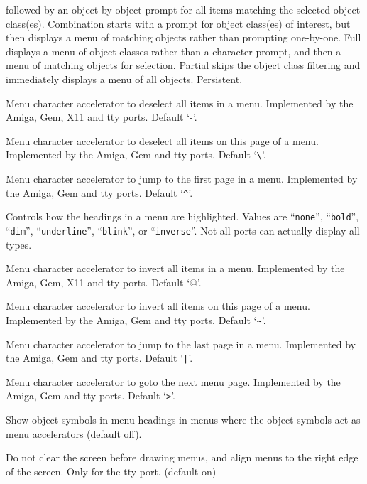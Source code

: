 followed by an object-by-object prompt for all items matching the selected
object class(es).
Combination starts with a prompt for object class(es)
of interest, but then displays a menu of matching objects rather than
prompting one-by-one.
Full displays a menu of
object classes rather than a character prompt, and then a menu of matching
objects for selection.
Partial skips the object class filtering and
immediately displays a menu of all objects.
Persistent.
\item[\ib{menu\verb+_+deselect\verb+_+all}]
Menu character accelerator to deselect all items in a menu.
Implemented by the Amiga, Gem, X11 and tty ports.
Default `-'.
\item[\ib{menu\verb+_+deselect\verb+_+page}]
Menu character accelerator to deselect all items on this page of a menu.
Implemented by the Amiga, Gem and tty ports.
Default `\verb+\+'.
\item[\ib{menu\verb+_+first\verb+_+page}]
Menu character accelerator to jump to the first page in a menu.
Implemented by the Amiga, Gem and tty ports.
Default `\verb+^+'.
\item[\ib{menu\verb+_+headings}]
Controls how the headings in a menu are highlighted.
Values are ``{\tt none}'', ``{\tt bold}'', ``{\tt dim}'',
``{\tt underline}'', ``{\tt blink}'', or ``{\tt inverse}''.
Not all ports can actually display all types.
\item[\ib{menu\verb+_+invert\verb+_+all}]
Menu character accelerator to invert all items in a menu.
Implemented by the Amiga, Gem, X11 and tty ports.
Default `@'.
\item[\ib{menu\verb+_+invert\verb+_+page}]
Menu character accelerator to invert all items on this page of a menu.
Implemented by the Amiga, Gem and tty ports.
Default `\verb+~+'.
\item[\ib{menu\verb+_+last\verb+_+page}]
Menu character accelerator to jump to the last page in a menu.
Implemented by the Amiga, Gem and tty ports.
Default `\verb+|+'.
\item[\ib{menu\verb+_+next\verb+_+page}]
Menu character accelerator to goto the next menu page.
Implemented by the Amiga, Gem and tty ports.
Default `\verb+>+'.
\item[\ib{menu\verb+_+objsyms}]
Show object symbols in menu headings in menus where
the object symbols act as menu accelerators (default off).
\item[\ib{menu\verb+_+overlay}]
Do not clear the screen before drawing menus, and align
menus to the right edge of the screen. Only for the tty port.
(default on)
